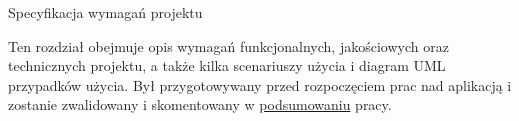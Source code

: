 \begin{chapter}{Specyfikacja wymagań projektu}
	\newcommand{\chapterPath}{rozdzialy/2_wymagania}
	
	Ten rozdział obejmuje opis wymagań funkcjonalnych, jakościowych oraz technicznych projektu, a także kilka scenariuszy użycia i diagram UML przypadków użycia. Był przygotowywany przed rozpoczęciem prac nad aplikacją i zostanie zwalidowany i skomentowany w \hyperref[ch:podsumowanie]{podsumowaniu} pracy.

	
	
	
	
	
\end{chapter}
